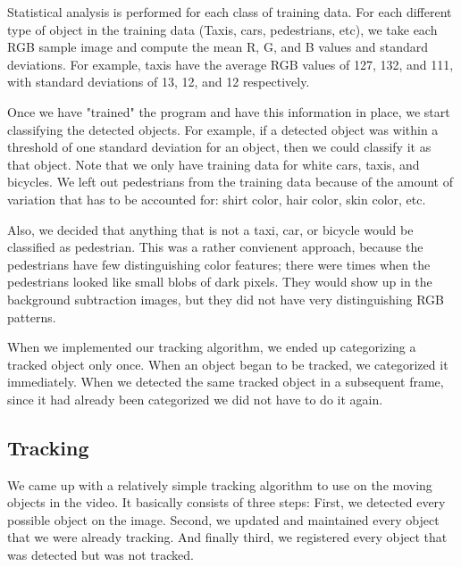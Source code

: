 \documentclass[a4paper, 10pt, conference]{ieeeconf}      %
\begin{document}
Statistical analysis is performed for each class of training data. For each different type of object in the training data (Taxis, cars, pedestrians, etc), we take each RGB sample image and compute the mean R, G, and B values and standard deviations. For example, taxis have the average RGB values of 127, 132, and 111, with standard deviations of 13, 12, and 12 respectively. \newline

Once we have "trained" the program and have this information in place, we start classifying the detected objects. For example, if a detected object was within a threshold of one standard deviation for an object, then we could classify it as that object. Note that we only have training data for white cars, taxis, and bicycles. We left out pedestrians from the training data because of the amount of variation that has to be accounted for: shirt color, hair color, skin color, etc. \newline

Also, we decided that anything that is not a taxi, car, or bicycle would be classified as pedestrian. This was a rather convienent approach, because the pedestrians have few distinguishing color features; there were times when the pedestrians looked like small blobs of dark pixels. They would show up in the background subtraction images, but they did not have very distinguishing RGB patterns.\newline

When we implemented our tracking algorithm, we ended up categorizing a tracked object only once. When an object began to be tracked, we categorized it immediately. When we detected the same tracked object in a subsequent frame, since it had already been categorized we did not have to do it again. \newline



\subsection{Tracking}

We came up with a relatively simple tracking algorithm to use on the moving objects in the video. It basically consists of three steps: First, we detected every possible object on the image. Second, we updated and maintained every object that we were already tracking. And finally third, we registered every object that was detected but was not tracked. 
\newline
\end{document}
